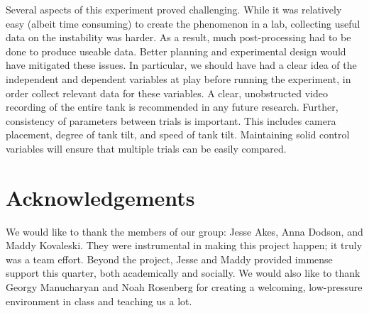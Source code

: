 \documentclass{article}
\begin{document}
Several aspects of this experiment proved challenging. While it was relatively
easy (albeit time consuming) to create the phenomenon in a lab, collecting
useful data on the instability was harder. As a result, much post-processing had
to be done to produce useable data. Better planning and experimental design
would have mitigated these issues. In particular, we should have had a clear
idea of the independent and dependent variables at play before running the
experiment, in order collect relevant data for these variables. A clear,
unobstructed video recording of the entire tank is recommended in any future
research. Further, consistency of parameters between trials is important. This
includes camera placement, degree of tank tilt, and speed of tank tilt.
Maintaining solid control variables will ensure that multiple trials can be
easily compared.

\section{Acknowledgements}

We would like to thank the members of our group: Jesse Akes, Anna Dodson, and
Maddy Kovaleski. They were instrumental in making this project happen; it truly
was a team effort. Beyond the project, Jesse and Maddy provided immense support
this quarter, both academically and socially. We would also like to thank Georgy
Manucharyan and Noah Rosenberg for creating a welcoming, low-pressure
environment in class and teaching us a lot.  

\newpage
{}

\end{document}
